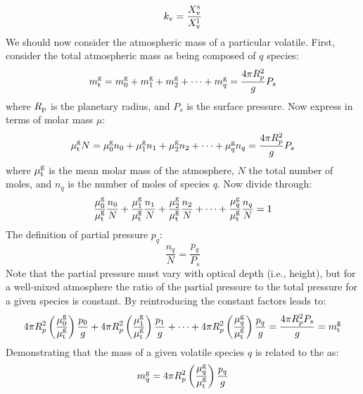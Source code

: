 \begin{equation}
k_{\rm v} = \frac{X_{\rm v}^{\rm s}}{X_{\rm v}^{\rm l}}
\end{equation}
We should now consider the  atmospheric mass of a particular volatile.  First, consider the total atmospheric mass as being composed of $q$ species:
\begin{equation}
m_{\rm t}^{\rm g} = m_0^{\rm g} + m_1^{\rm g} + m_2^{\rm g} + \dots + m_q^{\rm g} = \frac{4 \pi R_p^2}{g} P_s
\end{equation}
where $R_{\rm p}$ is the planetary radius, and $P_s$ is the surface pressure.  Now express in terms of molar mass $\mu$:
\begin{equation}
\mu_{\rm t}^{\rm g} N = \mu_0^{\rm g} n_0 + \mu_1^{\rm g} n_1 + \mu_2^{\rm g} n_2+ \dots + \mu_q^{\rm g} n_q = \frac{4 \pi R_p^2}{g} P_s
\end{equation}
where $\mu_{\rm t}^{\rm g}$ is the mean molar mass of the atmosphere, $N$ the total number of moles, and $n_q$ is the number of moles of species $q$.  Now divide through:
\begin{equation}
\frac{\mu_0^{\rm g}}{\mu_{\rm t}^{\rm g}} \frac{n_0}{N} + \frac{\mu_1^{\rm g}}{\mu_{\rm t}^{\rm g}} \frac{n_1}{N} + \frac{\mu_2^{\rm g}}{\mu_{\rm t}^{\rm g}} \frac{n_2}{N}+ \dots + \frac{\mu_q^{\rm g}}{\mu_{\rm t}^{\rm g}} \frac{n_q}{N} = 1
\end{equation}
The definition of partial pressure $p_q$:
\begin{equation}
\frac{n_q}{N} = \frac{p_q}{P_s}
\end{equation}
Note that the partial pressure must vary with optical depth (i.e., height), but for a well-mixed atmosphere the ratio of the partial pressure to the total pressure for a given species is constant.  By reintroducing the constant factors leads to:
\begin{equation}
4 \pi R_p^2 \left( \frac{\mu_0^{\rm g}}{\mu_{\rm t}^{\rm g}} \right) \frac{p_0}{g} + 4 \pi R_p^2 \left( \frac{\mu_1^{\rm g}}{\mu_{\rm t}^{\rm g}} \right) \frac{p_1}{g} + \dots + 4 \pi R_p^2 \left( \frac{\mu_q^{\rm g}}{\mu_{\rm t}^{\rm g}} \right) \frac{p_q}{g} = \frac{4 \pi R_p^2 P_s}{g} = m_{\rm t}^{\rm g}
\end{equation}
Demonstrating that the mass of a given volatile species $q$ is related to the  as:
\begin{equation}
m_q^{\rm g} = 4 \pi R_p^2 \left( \frac{\mu_q^{\rm g}}{\mu_{\rm t}^{\rm g}} \right) \frac{p_q}{g}
\end{equation}
